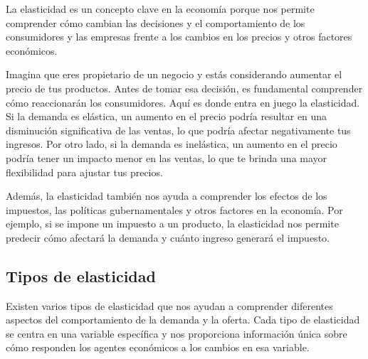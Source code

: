 \documentclass[
  jou,
  floatsintext,
  longtable,
  a4paper,
  nolmodern,
  notxfonts,
  notimes,
  12pt,
  colorlinks=true,linkcolor=blue,citecolor=blue,urlcolor=blue]{apa7}
\begin{document}
La elasticidad es un concepto clave en la economía porque nos permite
comprender cómo cambian las decisiones y el comportamiento de los
consumidores y las empresas frente a los cambios en los precios y otros
factores económicos.

Imagina que eres propietario de un negocio y estás considerando aumentar
el precio de tus productos. Antes de tomar esa decisión, es fundamental
comprender cómo reaccionarán los consumidores. Aquí es donde entra en
juego la elasticidad. Si la demanda es elástica, un aumento en el precio
podría resultar en una disminución significativa de las ventas, lo que
podría afectar negativamente tus ingresos. Por otro lado, si la demanda
es inelástica, un aumento en el precio podría tener un impacto menor en
las ventas, lo que te brinda una mayor flexibilidad para ajustar tus
precios.

Además, la elasticidad también nos ayuda a comprender los efectos de los
impuestos, las políticas gubernamentales y otros factores en la
economía. Por ejemplo, si se impone un impuesto a un producto, la
elasticidad nos permite predecir cómo afectará la demanda y cuánto
ingreso generará el impuesto.

\subsection{Tipos de elasticidad}\label{tipos-de-elasticidad}

Existen varios tipos de elasticidad que nos ayudan a comprender
diferentes aspectos del comportamiento de la demanda y la oferta. Cada
tipo de elasticidad se centra en una variable específica y nos
proporciona información única sobre cómo responden los agentes
económicos a los cambios en esa variable.
\end{document}
